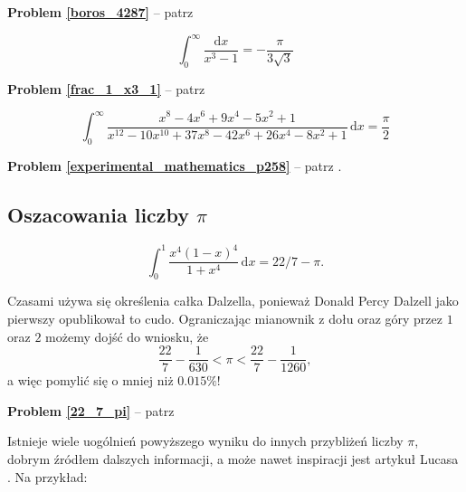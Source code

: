 \textbf{Problem \ref{boros_4287}} -- patrz \cite[s. 48-60]{boros04}

\begin{problem}
\label{frac_1_x3_1}%
\begin{equation}
    \int_0^\infty \frac{\mathrm{d}x}{x^3 - 1} = - \frac{\pi}{3\sqrt{3}}
\end{equation}
\end{problem}

\textbf{Problem \ref{frac_1_x3_1}} -- patrz \cite[s. 22]{nahin15}

\begin{problem}
    \label{experimental_mathematics_p258}%
\begin{equation}
    \int_0^\infty \frac{x^8-4x^6+9x^4-5x^2+1}{x^{12}-10x^{10}+37x^8-42x^6+26x^4-8x^2+1} \,\mathrm{d}x = \frac{\pi}{2}
\end{equation}
\end{problem}

\textbf{Problem \ref{experimental_mathematics_p258}} -- patrz \cite[s. 258]{bailey07}.

\subsection{Oszacowania liczby $\pi$}
\begin{problem}
\label{22_7_pi}%
\begin{equation}
    \int_0^1 \frac{x^4(1-x)^4}{1 + x^4} \,\mathrm{d}x = 22/7 - \pi.
\end{equation}
\end{problem}

Czasami używa się określenia całka Dalzella, ponieważ Donald Percy Dalzell \cite{dalzell44} jako pierwszy opublikował to cudo.
Ograniczając mianownik z dołu oraz góry przez $1$ oraz $2$ możemy dojść do wniosku, że
\begin{equation}
    \frac{22}{7} - \frac {1}{630} < \pi < \frac{22}{7} - \frac{1}{1260},
\end{equation}
a więc pomylić się o mniej niż $0.015\%$!

\textbf{Problem \ref{22_7_pi}} -- patrz \cite[s. 24]{nahin15}

Istnieje wiele uogólnień powyższego wyniku do innych przybliżeń liczby $\pi$, dobrym źródłem dalszych informacji, a może nawet inspiracji jest artykuł Lucasa \cite{lucas05}.
Na przykład:

